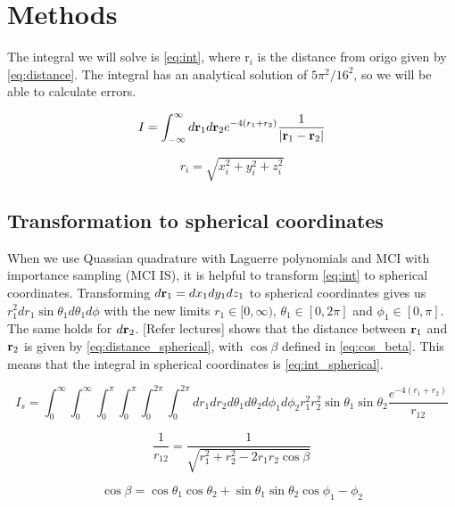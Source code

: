 \section{Methods}

The integral we will solve is \cref{eq:int}, where r$_i$ is the distance from
origo given by \cref{eq:distance}. The integral has an analytical solution of
$5\pi^2/16^2$, so we will be able to calculate errors.

\begin{equation}
  \label{eq:int}
  I = \int_{-\infty}^{\infty} d\mathbf{r}_1 d\mathbf{r}_2 e^{-4(r_1+r_2)}
  \frac{1}{\abs{\mathbf{r}_1 - \mathbf{r}_2}}
\end{equation}

\begin{equation}
  \label{eq:distance}
r_i = \sqrt{x_i^2 + y_i^2 + z_i^2}
\end{equation}

\subsection{Transformation to spherical coordinates}

When we use Quassian quadrature with Laguerre polynomials and MCI with importance
sampling (MCI IS), it is helpful to transform \cref{eq:int} to spherical coordinates.
Transforming $d\mathbf{r}_1 = dx_1dy_1dz_1$ to spherical coordinates gives us
$r_1^2 dr_1 \sin{\theta_1}d\theta_1 d\phi$ with the new limits $r_1 \in [0, \infty)$,
 $\theta_1 \in [0, 2\pi]$ and $\phi_1 \in [0,\pi]$. The same holds for $d\mathbf{r}_2$.
[Refer lectures] shows that the distance between $\mathbf{r}_1$ and $\mathbf{r}_2$ is given by
\cref{eq:distance_spherical}, with $\cos{\beta}$ defined in \cref{eq:cos_beta}.
This means that the integral in spherical coordinates is \cref{eq:int_spherical}.

\begin{equation}
  \label{eq:int_spherical}
  I_s = \int_{0}^{\infty} \int_{0}^{\infty} \int_{0}^{\pi} \int_{0}^{\pi}
  \int_{0}^{2\pi} \int_{0}^{2\pi}
  dr_1 dr_2 d\theta_1 d\theta_2 d\phi_1 d\phi_2
  r_1^2 r_2^2 \sin{\theta_1} \sin{\theta_2} \frac{e^{-4(r_1 + r_2)}}{r_{12}}
\end{equation}

\begin{equation}
  \label{eq:distance_spherical}
  \frac{1}{r_{12}} = \frac{1}{\sqrt{r_1^2 + r_2^2 - 2r_1r_2 \cos{\beta}}}
\end{equation}

\begin{equation}
  \label{eq:cos_beta}
  \cos{\beta} = \cos{\theta_1} \cos{\theta_2} + \sin{\theta_1} \sin{\theta_2}
  \cos{\phi_1 -\phi_2}
\end{equation}

